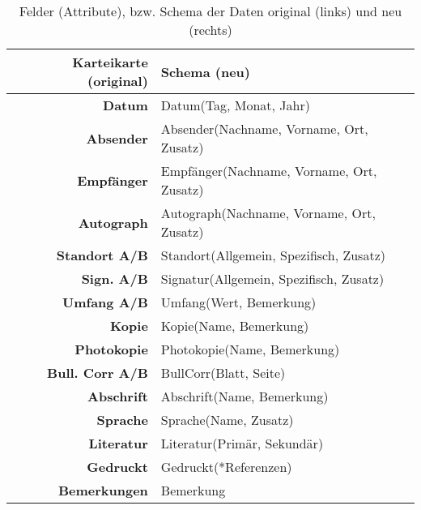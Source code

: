 \begin{table}[H]
\centering
\begin{footnotesize}
\begin{tabular}{rp{8cm}}
\hline\hline
Karteikarte (original)	& Schema (neu)\\
\hline
\textbf{Datum} 				& Datum(Tag, Monat, Jahr)\\
\textbf{Absender}			& Absender(Nachname, Vorname, Ort, Zusatz)\\
\textbf{Empfänger}			& Empfänger(Nachname, Vorname, Ort, Zusatz)\\
\textbf{Autograph}			& Autograph(Nachname, Vorname, Ort, Zusatz)\\
\textbf{Standort A/B}		& Standort(Allgemein, Spezifisch, Zusatz)\\
\textbf{Sign. A/B}			& Signatur(Allgemein, Spezifisch, Zusatz)\\
\textbf{Umfang A/B}			& Umfang(Wert, Bemerkung)\\
\textbf{Kopie}				& Kopie(Name, Bemerkung)\\
\textbf{Photokopie}			& Photokopie(Name, Bemerkung)\\
\textbf{Bull. Corr A/B}		& BullCorr(Blatt, Seite)\\
\textbf{Abschrift}			& Abschrift(Name, Bemerkung)\\
\textbf{Sprache}			& Sprache(Name, Zusatz)\\
\textbf{Literatur}			& Literatur(Primär, Sekundär)\\
\textbf{Gedruckt}			& Gedruckt(*Referenzen)\\
\textbf{Bemerkungen}		& Bemerkung\\
\hline\hline
\end{tabular}
\end{footnotesize}
\caption{Felder (Attribute), bzw. Schema der Daten original (links) und neu (rechts)}
\end{table}
